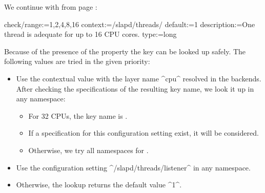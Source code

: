 \begin{example}
We continue with  from page \pageref{ex:introduction-solution}:

\begin{code}
  check/range:=1,2,4,8,16
  context:=/slapd/threads/%
  default:=1
  description:=One thread is adequate for up to 16 CPU cores.
  type:=long
\end{code}

Because of the presence of the property  the key  can be looked up safely.
The following values are tried in the given priority:
\begin{itemize}
\item Use the contextual value with the layer name ^cpu^ resolved in the backends.
After checking the specifications of the resulting key name, we look it up in any namespace:
\begin{itemize}
\item 
For 32 CPUs, the key name is .
\item 
If a specification for this configuration setting exist, it will be considered.
\item
Otherwise, we try all namespaces for .
\end{itemize}
\item Use the configuration setting ^/slapd/threads/listener^ in any namespace.
\item Otherwise, the lookup returns the default value ^1^.
\end{itemize}
\end{example}

